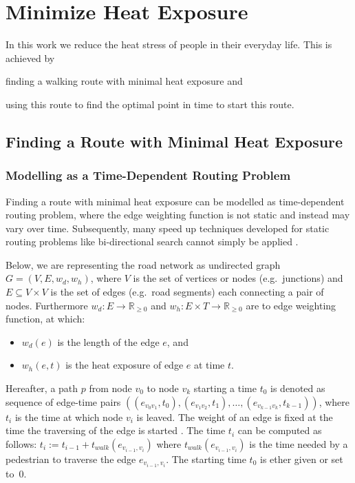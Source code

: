 
\section{Minimize Heat Exposure}
In this work we reduce the heat stress of people in their everyday life. This is achieved by
\begin{inparaenum}[(1)]
  \item finding a walking route with minimal heat exposure and
  \item using this route to find the optimal point in time to start this route. 
\end{inparaenum}


\subsection{Finding a Route with Minimal Heat Exposure \label{sec:optimal-route}}

\subsubsection{Modelling as a Time-Dependent Routing Problem}

Finding a route with minimal heat exposure can be modelled as time-dependent routing problem, where the edge weighting function is not static and instead may vary over time. Subsequently, many speed up techniques developed for static routing problems like bi-directional search cannot simply be applied \parencite{Delling2009}. 

Below, we are representing the road network as undirected graph $G=(V,E,w_d,w_h)$, where $V$ is the set of vertices or nodes (e.g.\ junctions) and $E\subseteq V\times V$ is the set of edges (e.g.\ road segments) each connecting a pair of nodes. Furthermore $w_d: E \to \mathbb{R}_{\geq 0}$ and $w_h: E \times T \to \mathbb{R}_{\geq 0}$ are to edge weighting function, at which:
\begin{itemize}
	\item $w_d(e)$ is the length of the edge $e$, and
	\item $w_h(e, t)$ is the heat exposure of edge $e$ at time $t$.
\end{itemize}   
Hereafter, a path $p$ from node $v_0$ to node $v_k$ starting a time $t_0$ is denoted as sequence of edge-time pairs $((e_{v_0v_1},t_0),(e_{v_1v_2},t_1),\dots, (e_{v_{k-1}v_k},t_{k-1}))$, where $t_i$ is the time at which node $v_i$ is leaved. The weight of an edge is fixed at the time the traversing of the edge is started \parencite[the so-called frozen link model,][]{Orda1990}. The time $t_i$ can be computed as follows: $t_i := t_{i-1} + t_{walk}(e_{v_{i-1},v_i})$ where $t_{walk}(e_{v_{i-1},v_i})$ is the time needed by a pedestrian to traverse the edge $e_{v_{i-1},v_i}$. The starting time $t_0$ is ether given or set to~$0$. 

